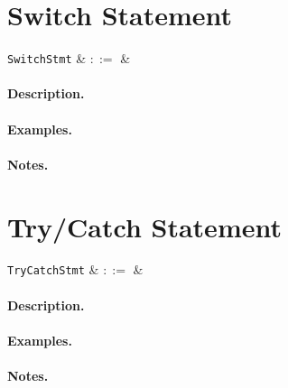 
\section{Switch Statement}

\begin{syntax}
  \verb+SwitchStmt+ & $::=$ &\\
\end{syntax}

\paragraph{Description.}

\paragraph{Examples.}

\paragraph{Notes.} 


\section{Try/Catch Statement}

\begin{syntax}
  \verb+TryCatchStmt+ & $::=$ &\\
\end{syntax}

\paragraph{Description.}

\paragraph{Examples.}

\paragraph{Notes.} 
